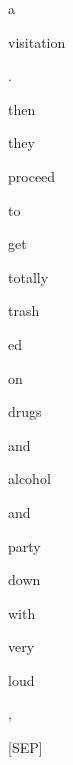 \documentclass[varwidth=150mm]{standalone}
\begin{document}
\begin{CJK*}{UTF8}{gbsn}
{{{\colorbox{red!0.0}{\strut a} \colorbox{red!1.7182023525238037}{\strut visitation} \colorbox{red!0.0}{\strut .} \colorbox{red!17.934656143188477}{\strut then} \colorbox{red!13.806989669799805}{\strut they} \colorbox{red!2.6780502796173096}{\strut proceed} \colorbox{red!15.32153606414795}{\strut to} \colorbox{red!0.0}{\strut get} \colorbox{red!5.071225643157959}{\strut totally} \colorbox{red!0.0}{\strut trash}\colorbox{red!0.0}{\strut ed} \colorbox{red!0.0}{\strut on} \colorbox{red!0.0}{\strut drugs} \colorbox{red!0.0}{\strut and} \colorbox{red!1.4962142705917358}{\strut alcohol} \colorbox{red!9.686078071594238}{\strut and} \colorbox{red!1.4948009252548218}{\strut party} \colorbox{red!0.0}{\strut down} \colorbox{red!5.7631916999816895}{\strut with} \colorbox{red!5.038027286529541}{\strut very} \colorbox{red!3.1080679893493652}{\strut loud} \colorbox{red!59.069915771484375}{\strut ,} \colorbox{red!2.602174758911133}{\strut [SEP]}
}}}
\end{CJK*}
\end{document}
